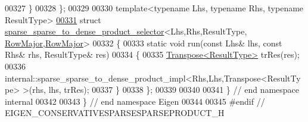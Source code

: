 \begin{DoxyCode}
00327   \}
00328 \};
00329 
00330 \textcolor{keyword}{template}<\textcolor{keyword}{typename} Lhs, \textcolor{keyword}{typename} Rhs, \textcolor{keyword}{typename} ResultType>
\hyperlink{struct_eigen_1_1internal_1_1sparse__sparse__to__dense__product__selector_3_01_lhs_00_01_rhs_00_01573c79e134c90f065c2aee6c07fd478}{00331} \textcolor{keyword}{struct }\hyperlink{struct_eigen_1_1internal_1_1sparse__sparse__to__dense__product__selector}{sparse\_sparse\_to\_dense\_product\_selector}<Lhs,Rhs,ResultType,
      \hyperlink{group__enums_ggaacded1a18ae58b0f554751f6cdf9eb13acfcde9cd8677c5f7caf6bd603666aae3}{RowMajor},\hyperlink{group__enums_ggaacded1a18ae58b0f554751f6cdf9eb13acfcde9cd8677c5f7caf6bd603666aae3}{RowMajor}>
00332 \{
00333   \textcolor{keyword}{static} \textcolor{keywordtype}{void} run(\textcolor{keyword}{const} Lhs& lhs, \textcolor{keyword}{const} Rhs& rhs, ResultType& res)
00334   \{
00335     \hyperlink{group___core___module_class_eigen_1_1_transpose}{Transpose<ResultType>} trRes(res);
00336     internal::sparse\_sparse\_to\_dense\_product\_impl<Rhs,Lhs,Transpose<ResultType> >(rhs, lhs, trRes);
00337   \}
00338 \};
00339 
00340 
00341 \} \textcolor{comment}{// end namespace internal}
00342 
00343 \} \textcolor{comment}{// end namespace Eigen}
00344 
00345 \textcolor{preprocessor}{#endif // EIGEN\_CONSERVATIVESPARSESPARSEPRODUCT\_H}
\end{DoxyCode}
